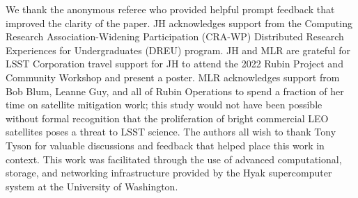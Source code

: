 \documentclass[twocolumn]{aastex631}
\begin{document}


\begin{acknowledgments}
We thank the anonymous referee who provided helpful prompt feedback that improved the clarity of the paper.
JH acknowledges support from the Computing Research Association-Widening Participation (CRA-WP) Distributed Research Experiences for Undergraduates (DREU) program.
JH and MLR are grateful for LSST Corporation travel support for JH to attend the 2022 Rubin Project and Community Workshop and present a poster.
MLR acknowledges support from Bob Blum, Leanne Guy, and all of Rubin Operations to spend a fraction of her time on satellite mitigation work; this study would not have been possible without formal recognition that the proliferation of bright commercial LEO satellites poses a threat to LSST science.
The authors all wish to thank Tony Tyson for valuable discussions and feedback that helped place this work in context.
This work was facilitated through the use of advanced computational, storage, and networking infrastructure provided by the Hyak supercomputer system at the University of Washington.
\end{acknowledgments}
\end{document}
